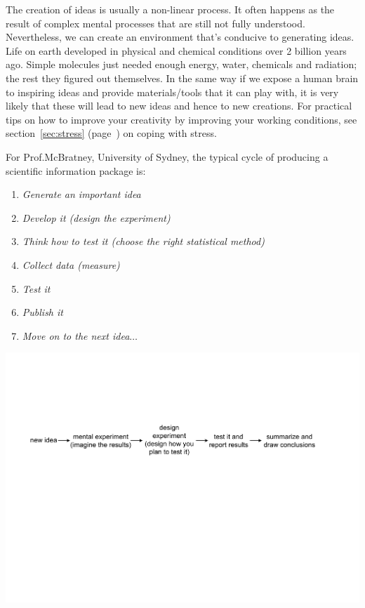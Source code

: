 \documentclass[graybox,envcountchap,sectrefs,UStrade]{svmono}
\begin{document}
The creation of ideas is usually a non-linear process. It often happens as the result of complex mental processes that are still not fully understood. Nevertheless, we can create an environment that's conducive to generating ideas. Life on earth developed in physical and chemical conditions over 2 billion years ago. Simple molecules just needed enough energy, water, chemicals and radiation; the rest they figured out themselves. In the same way if we expose a human brain to inspiring ideas and provide materials/tools that it can play with, it is very likely that these will lead to new ideas and hence to new creations. For practical tips on how to improve your creativity by improving your working conditions, see section~\ref{sec:stress} (page~\pageref{sec:stress}) on coping with stress. \par

For Prof.\@ McBratney, University of Sydney, the typical cycle of producing a scientific information package is:

\begin{enumerate}
  \item \emph{Generate an important idea}
  \item \emph{Develop it (design the experiment)}
  \item \emph{Think how to test it (choose the right statistical method)}
  \item \emph{Collect data (measure)}
  \item \emph{Test it}
  \item \emph{Publish it}
  \item \emph{Move on to the next idea}$\ldots$
\end{enumerate}

\begin{flushleft}
\includegraphics[width=\textwidth]{Fig_new_idea_flow.pdf}
\end{flushleft}
\end{document}
